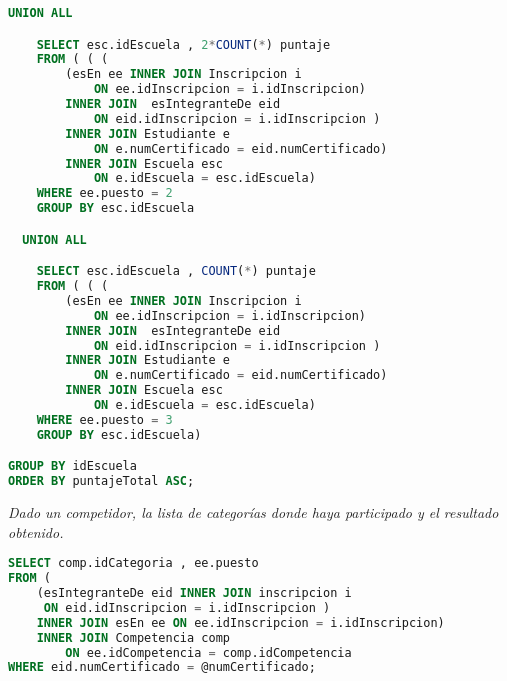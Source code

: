 \begin{lstlisting}[language=SQL]
  UNION ALL

    SELECT esc.idEscuela , 2*COUNT(*) puntaje
    FROM ( ( (
        (esEn ee INNER JOIN Inscripcion i
            ON ee.idInscripcion = i.idInscripcion)
        INNER JOIN  esIntegranteDe eid
            ON eid.idInscripcion = i.idInscripcion )
        INNER JOIN Estudiante e
            ON e.numCertificado = eid.numCertificado)
        INNER JOIN Escuela esc
            ON e.idEscuela = esc.idEscuela)
    WHERE ee.puesto = 2
    GROUP BY esc.idEscuela

  UNION ALL

    SELECT esc.idEscuela , COUNT(*) puntaje
    FROM ( ( (
        (esEn ee INNER JOIN Inscripcion i
            ON ee.idInscripcion = i.idInscripcion)
        INNER JOIN  esIntegranteDe eid
            ON eid.idInscripcion = i.idInscripcion )
        INNER JOIN Estudiante e
            ON e.numCertificado = eid.numCertificado)
        INNER JOIN Escuela esc
            ON e.idEscuela = esc.idEscuela)
    WHERE ee.puesto = 3
    GROUP BY esc.idEscuela)

GROUP BY idEscuela
ORDER BY puntajeTotal ASC;
\end{lstlisting}


\emph{Dado un competidor, la lista de categorías donde haya participado y el resultado obtenido.}
\begin{lstlisting}[language=SQL]
SELECT comp.idCategoria , ee.puesto
FROM (
    (esIntegranteDe eid INNER JOIN inscripcion i
     ON eid.idInscripcion = i.idInscripcion )
    INNER JOIN esEn ee ON ee.idInscripcion = i.idInscripcion)
    INNER JOIN Competencia comp
        ON ee.idCompetencia = comp.idCompetencia
WHERE eid.numCertificado = @numCertificado;
\end{lstlisting}



